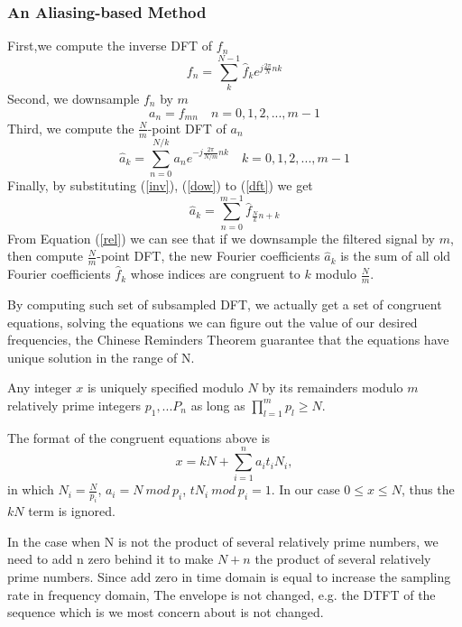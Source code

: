 \documentclass[journal,transmag]{IEEEtran}
\begin{document}
\subsubsection{An Aliasing-based Method}
First,we compute the inverse DFT of $f_n$
\begin{equation}
	f_n = \sum_{k}^{N-1}\hat{f}_ke^{j\frac{2\pi}{N}nk}
	\label{inv}
\end{equation} 
Second, we downsample $f_n$ by $m$
\begin{equation}
	a_n=f_{mn} \quad n=0,1,2,...,m-1
	\label{dow}
\end{equation}
Third, we compute the $\frac{N}{m}$-point DFT of $a_n$
\begin{equation}
	\hat{a}_k = \sum_{n=0}^{N/k}a_ne^{-j\frac{2\pi}{N/m}nk} \quad k = 0,1,2,...,m-1
	\label{dft}
\end{equation}
Finally, by substituting (\ref{inv}), (\ref{dow}) to (\ref{dft}) we get
\begin{equation}
	\hat{a}_k=\sum_{n=0}^{m-1}\hat{f}_{\frac{N}{k}n+k}
	\label{rel}
\end{equation}
From Equation (\ref{rel}) we can see that if we downsample the filtered signal by $m$, then compute $\frac{N}{m}$-point DFT, the new Fourier coefficients $\hat{a}_k$ is the sum of all old Fourier coefficients $\hat{f}_k$ whose indices are congruent to $k$ modulo $\frac{N}{m}$.

By computing such set of subsampled DFT, we actually get a set of congruent equations, solving the equations we can figure out the value of our desired frequencies, the Chinese Reminders Theorem guarantee that the equations have unique solution in the range of N.
\begin{thm}
	Any integer $x$ is uniquely specified modulo $N$ by its remainders modulo $m$ relatively prime integers $p_1,...P_n$ as long as $\prod_{l=1}^{m}p_l \geq N$.
\end{thm}
The format of the congruent equations above is 
\begin{equation}
	x = kN + \sum_{i=1}^{n}a_it_iN_i,
\end{equation}
in which $N_i=\frac{N}{p_i}$, $a_i=N \: mod\:  p_i$, $tN_i\:mod\:p_i=1$. In our case $0\leq x\leq N$, thus the $kN$ term is ignored.

In the case when N is not the product of several relatively prime numbers, we need to add n zero behind it to make $N+n$ the product of several relatively prime numbers. Since add zero in time domain is equal to increase the sampling rate in frequency domain, The envelope is not changed, e.g. the DTFT of the sequence which is we most concern about is not changed.
\end{document}
